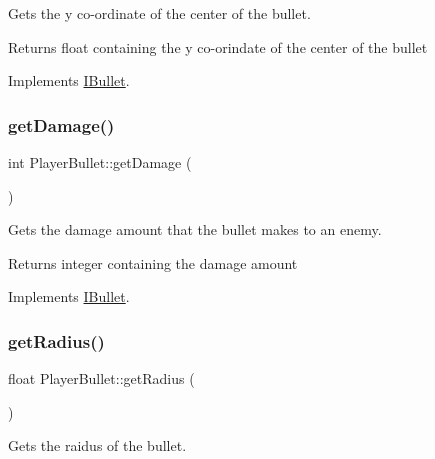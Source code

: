 Gets the y co-\/ordinate of the center of the bullet. 

\begin{DoxyReturn}{Returns}
float containing the y co-\/orindate of the center of the bullet 
\end{DoxyReturn}


Implements \hyperlink{class_i_bullet_a8245ed2bc72beed1d69547ce5f87a021}{I\+Bullet}.

\mbox{\label{class_player_bullet_a55375b5c3f4f87d00daba1cda12b1e79}} 
\subsubsection{\texorpdfstring{get\+Damage()}{getDamage()}}
{\footnotesize\ttfamily int Player\+Bullet\+::get\+Damage (\begin{DoxyParamCaption}{ }\end{DoxyParamCaption})\hspace{0.3cm}{\ttfamily [virtual]}}



Gets the damage amount that the bullet makes to an enemy. 

\begin{DoxyReturn}{Returns}
integer containing the damage amount 
\end{DoxyReturn}


Implements \hyperlink{class_i_bullet_ab6643a4ad3888ee4ebfbc3d445c4b73d}{I\+Bullet}.

\mbox{\label{class_player_bullet_a1ff56e38b1447500d2887b6fe1eeb674}} 
\subsubsection{\texorpdfstring{get\+Radius()}{getRadius()}}
{\footnotesize\ttfamily float Player\+Bullet\+::get\+Radius (\begin{DoxyParamCaption}{ }\end{DoxyParamCaption})\hspace{0.3cm}{\ttfamily [virtual]}}



Gets the raidus of the bullet. 

